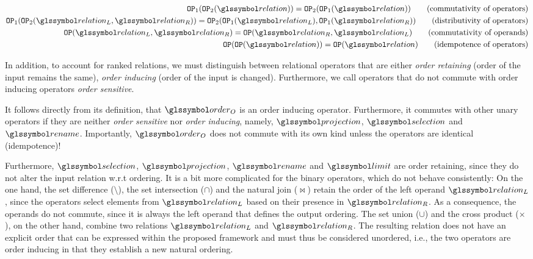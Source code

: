 \begin{align}
    \label{equation:algebraic_properties}
    \mathtt{OP}_1 (\mathtt{OP}_2 ( \relation)) = \mathtt{OP}_2 (\mathtt{OP}_1 (\relation))   \tag{commutativity of operators} \\
    \mathtt{OP}_{1} (\mathtt{OP}_{2} (\relation_L,  \relation_R)) = \mathtt{OP}_{2} ( \mathtt{OP}_{1} ( \relation_L), \mathtt{OP}_{1} ( \relation_R))  \tag{distributivity of operators}\\
    \mathtt{OP} (\relation_L, \relation_R) = \mathtt{OP}(\relation_R, \relation_L)    \tag{commutativity of operands}\\
    \mathtt{OP}(\mathtt{OP} ( \relation)) = \mathtt{OP} (\relation)   \tag{idempotence of operators} \\
\end{align}
  
In addition, to account for ranked relations, we must distinguish between relational operators that are either \emph{order retaining} (order of the input remains the same), \emph{order inducing} (order of the input is changed). Furthermore, we call operators that do not commute with order inducing operators \emph{order sensitive}. 

It follows directly from its definition, that $\order_{O}$ is an order inducing operator. Furthermore, it commutes with other unary operators if they are neither \emph{order sensitive} nor \emph{order inducing}, namely, $\projection$, $\selection$ and $\rename$. Importantly, $\order_{O}$ does not commute with its own kind unless the operators are identical (idempotence)! 

Furthermore, $\selection$, $\projection$, $\rename$ and $\limit$ are order retaining, since they do not alter the input relation w.r.t ordering. It is a bit more complicated for the binary operators, which do not behave consistently: On the one hand, the set difference ($\setminus$), the set intersection ($\cap$) and the natural join ($\Join$) retain the order of the left operand $\relation_L$, since the operators select elements from $\relation_L$ based on their presence in $\relation_R$. As a consequence, the operands do not commute, since it is always the left operand that defines the output ordering. The set union ($\cup$) and the cross product ($\times$), on the other hand, combine two relations $\relation_L$ and $\relation_R$. The resulting relation does not have an explicit order that can be expressed within the proposed framework and must thus be considered unordered, i.e., the two operators are order inducing in that they establish a new natural ordering.

